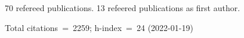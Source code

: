 70 refereed publications. 13 refeered publications as first author.

Total citations~=~2259; h-index~=~24 (2022-01-19)